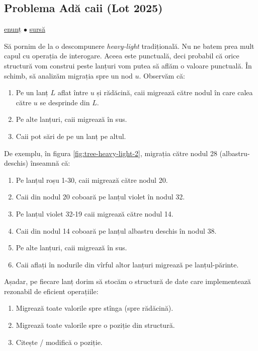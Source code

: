 \documentclass[../main.tex]{subfiles}
\begin{document}
\subsection{Problema Adă caii (Lot 2025)}
\label{problem:ada-caii}

\href{https://kilonova.ro/problems/3819}{enunț}
$\bullet$
\hyperref[code:ada-caii]{sursă}

Să pornim de la o descompunere \textit{heavy-light} tradițională. Nu ne batem prea mult capul cu operația de interogare. Aceea este punctuală, deci probabil că orice structură vom construi peste lanțuri vom putea să aflăm o valoare punctuală. În schimb, să analizăm migrația spre un nod $u$. Observăm că:

\begin{enumerate}
  \item Pe un lanț $L$ aflat între $u$ și rădăcină, caii migrează către nodul în care calea către $u$ se desprinde din $L$.
  \item Pe alte lanțuri, caii migrează în sus.
  \item Caii pot sări de pe un lanț pe altul.
\end{enumerate}

De exemplu, în figura \ref{fig:tree-heavy-light-2}, migrația către nodul 28 (albastru-deschis) înseamnă că:

\begin{enumerate}
  \item Pe lanțul roșu 1-30, caii migrează către nodul 20.
  \item Caii din nodul 20 coboară pe lanțul violet în nodul 32.
  \item Pe lanțul violet 32-19 caii migrează către nodul 14.
  \item Caii din nodul 14 coboară pe lanțul albastru deschis în nodul 38.
  \item Pe alte lanțuri, caii migrează în sus.
  \item Caii aflați în nodurile din vîrful altor lanțuri migrează pe lanțul-părinte.
\end{enumerate}

Așadar, pe fiecare lanț dorim să stocăm o structură de date care implementează rezonabil de eficient operațiile:

\begin{enumerate}
  \item Migrează toate valorile spre stînga (spre rădăcină).
  \item Migrează toate valorile spre o poziție din structură.
  \item Citește / modifică o poziție.
\end{enumerate}
\end{document}
